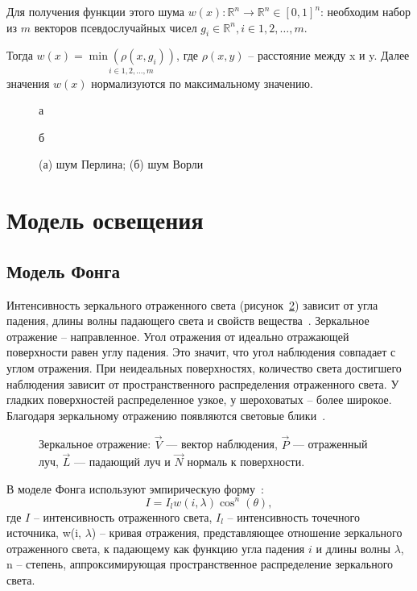 Для получения функции этого шума $w(x): \mathbb{R}^n \rightarrow \mathbb{R}^n \in [0, 1]^n$: необходим набор из $m$ векторов псевдослучайных чисел $g_i \in \mathbb{R}^n, i \in 1, 2, \ldots, m$.

Тогда $w(x) = \underset{i \in 1, 2, \ldots, m}{\min \left( \rho(x, g_i) \right)}$, где $\rho(x, y)$ -- расстояние между x и y. Далее значения $w(x)$ нормализуются по максимальному значению.

\begin{figure}[htb!]
	\centering
	\begin{minipage}{0.48\textwidth}
		\centering
		
		\caption*{а}
	\end{minipage}
	\hfill
	\begin{minipage}{0.48\textwidth}
		\centering
		
		\caption*{б}
	\end{minipage}
	\caption{(а) шум Перлина; (б) шум Ворли}
	\label{fig:noise-images}
\end{figure}

\section{Модель освещения}
\subsection{Модель Фонга}
Интенсивность зеркального отраженного света (рисунок~\ref{fig:phong}) зависит от угла падения, длины волны падающего света и свойств вещества~\cite{rodgers1989algorithms}. Зеркальное отражение -- направленное. Угол отражения от идеально отражающей поверхности равен углу падения. Это значит, что угол наблюдения совпадает с углом отражения. При неидеальных поверхностях, количество света достигшего наблюдения зависит от пространственного распределения отраженного света. У гладких поверхностей распределенное узкое, у шероховатых -- более широкое. Благодаря зеркальному отражению появляются световые блики~\cite{rodgers1989algorithms}.
\begin{figure}[ht!]
	\centering
	   
	\caption{Зеркальное отражение: $\vec{V}$ — вектор наблюдения, $\vec{P}$ — отраженный луч, $\vec{L}$ — падающий луч и $\vec{N}$ нормаль к поверхности.} 
	\label{fig:phong}
\end{figure}

В моделе Фонга используют эмпирическую форму~\cite{rodgers1989algorithms}:
\begin{equation}
	\label{eq:phong}
	I = I_lw(i,\lambda)\cos^n(\theta),
\end{equation}
где $I$ -- интенсивность отраженного света, $I_l$ -- интенсивность точечного источника, w(i, $\lambda$) -- кривая отражения, представляющее отношение зеркального отраженного света, к падающему как функцию угла падения $i$ и длины волны $\lambda$, n -- степень, аппроксимирующая пространственное распределение зеркального света.
